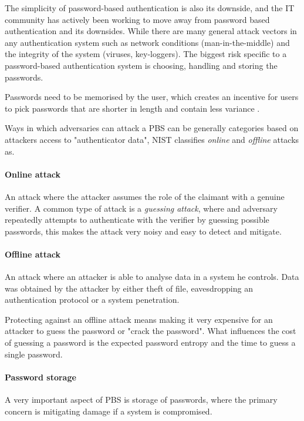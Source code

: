 The simplicity of password-based authentication is also its downside, and the IT community has actively been working to move away from password based authentication and its downsides.
While there are many general attack vectors in any authentication system such as network conditions (man-in-the-middle) and the integrity of the system (viruses, key-loggers). The biggest risk specific to a password-based authentication system is choosing, handling and storing the passwords.

Passwords need to be memorised by the user, which creates an incentive for users to pick passwords that are shorter in length and contain less variance \cite{conklin2004password}.

Ways in which adversaries can attack a PBS can be generally categories based on attackers access to "authenticator data", NIST \cite{grassi2017} classifies \textit{online} and \textit{offline} attacks as.

\paragraph{Online attack} An attack where the attacker assumes the role of the claimant with a genuine verifier.
A common type of attack is a \textit{guessing attack}, where and adversary repeatedly attempts to authenticate with the verifier by guessing possible passwords, this makes the attack very noisy and easy to detect and mitigate.


\paragraph{Offline attack} An attack where an attacker is able to analyse data in a system he controls. Data was obtained by the attacker by either theft of file, eavesdropping an authentication protocol or a system penetration.

Protecting against an offline attack means making it very expensive for an attacker to guess the password or "crack the password".
What influences the cost of guessing a password is the expected password entropy and the time to guess a single password.





\paragraph{Password storage}
A very important aspect of PBS is storage of passwords, where the primary concern is mitigating damage if a system is compromised.








